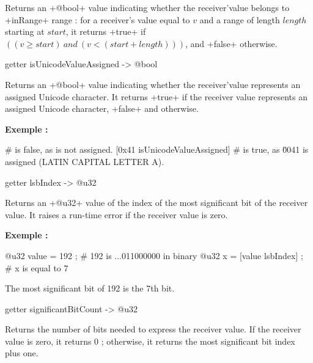 {Returns an \ggsq+@bool+ value indicating whether the receiver'value belongs to \ggsq+inRange+ range : for a receiver's value equal to $v$ and a range of length $length$ starting at $start$, it returns \ggsq+true+ if $((v \geqslant start)~and~(v<(start+length)))$, and \ggsq+false+ otherwise.




\begin{galgas4}
getter isUnicodeValueAssigned -> @bool
\end{galgas4}

Returns an \ggsq+@bool+ value indicating whether the receiver'value represents an assigned Unicode character. It returns \ggsq+true+ if the receiver value represents an assigned Unicode character, \ggsq+false+ and otherwise.

\textbf{Exemple :}
\begin{galgas4}
 # is false, as \uFFFF is not assigned.
[0x41 isUnicodeValueAssigned] # is true, as \u0041 is assigned (LATIN CAPITAL LETTER A).
\end{galgas4}




\begin{galgas4}
getter lsbIndex -> @u32
\end{galgas4}

Returns an \ggsq+@u32+ value of the index of the most significant bit of the receiver value. It raises a run-time error if the receiver value is zero.

\textbf{Exemple :}
\begin{galgas4}
@u32 value = 192 ; # 192 is ...011000000 in binary
@u32 x = [value lsbIndex] ; # x is equal to 7
\end{galgas4}

The most significant bit of 192 is the 7th bit.





\begin{galgas4}
getter significantBitCount -> @u32
\end{galgas4}

Returns the number of bits needed to express the receiver value. If the receiver value is zero, it returns 0 ; otherwise, it returns the most significant bit index plus one.

}
